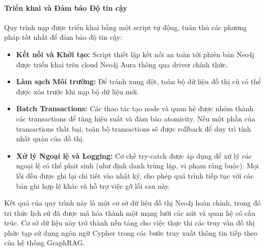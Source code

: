 \paragraph{Triển khai và Đảm bảo Độ tin cậy}
Quy trình nạp được triển khai bằng một script tự động, tuân thủ các phương pháp tốt nhất để đảm bảo độ tin cậy:
\begin{itemize}
    \item \textbf{Kết nối và Khởi tạo:} Script thiết lập kết nối an toàn tới phiên bản Neo4j được triển khai trên cloud Neo4j Aura thông qua driver chính thức.
    \item \textbf{Làm sạch Môi trường:} Để tránh xung đột, toàn bộ dữ liệu đồ thị cũ có thể được xóa trước khi nạp bộ dữ liệu mới.
    \item \textbf{Batch Transactions:} Các thao tác tạo node và quan hệ được nhóm thành các transactions để tăng hiệu suất và đảm bảo atomicity. Nếu một phần của transactions thất bại, toàn bộ transactions sẽ được rollback để duy trì tính nhất quán của đồ thị.
    \item \textbf{Xử lý Ngoại lệ và Logging:} Cơ chế try-catch được áp dụng để xử lý các ngoại lệ có thể phát sinh (như định danh trùng lặp, vi phạm ràng buộc). Mọi lỗi đều được ghi lại chi tiết vào nhật ký, cho phép quá trình tiếp tục với các bản ghi hợp lệ khác và hỗ trợ việc gỡ lỗi sau này.
\end{itemize}

Kết quả của quy trình này là một cơ sở dữ liệu đồ thị Neo4j hoàn chỉnh, trong đó tri thức lịch sử đã được mã hóa thành một mạng lưới các nút và quan hệ có cấu trúc. Cơ sở dữ liệu này trở thành nền tảng cho việc thực thi các truy vấn đồ thị phức tạp sử dụng ngôn ngữ Cypher trong các bước truy xuất thông tin tiếp theo của hệ thống GraphRAG.